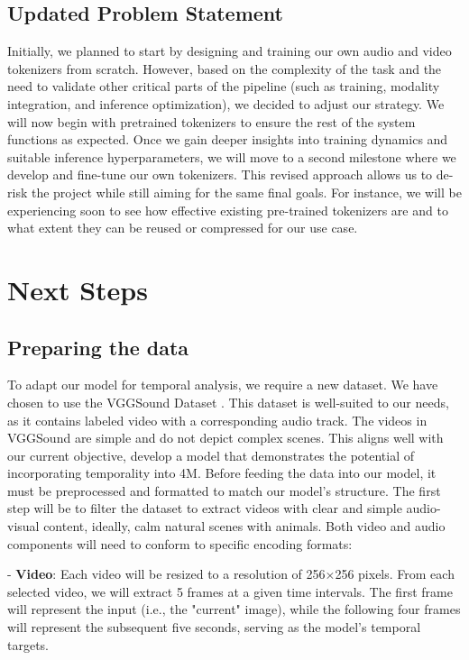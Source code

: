 \documentclass[10pt,conference,compsocconf]{IEEEtran}
\begin{document}
\subsection{Updated Problem Statement}
Initially, we planned to start by designing and training our own audio and video tokenizers from scratch. However, based on the complexity of the task and the need to validate other critical parts of the pipeline (such as training, modality integration, and inference optimization), we decided to adjust our strategy.
We will now begin with pretrained tokenizers to ensure the rest of the system functions as expected. Once we gain deeper insights into training dynamics and suitable inference hyperparameters, we will move to a second milestone where we develop and fine-tune our own tokenizers.
This revised approach allows us to de-risk the project while still aiming for the same final goals. For instance, we will be experiencing soon to see how effective existing pre-trained tokenizers are and to what extent they can be reused or compressed for our use case.


\section{Next Steps}
\subsection{Preparing the data}
To adapt our model for temporal analysis, we require a new dataset. We have chosen to use the VGGSound Dataset \cite{chen_vggsound_2020}. This dataset is well-suited to our needs, as it contains labeled video with a corresponding audio track. 
The videos in VGGSound are simple and do not depict complex scenes. This aligns well with our current objective, develop a model that demonstrates the potential of incorporating temporality into 4M.
Before feeding the data into our model, it must be preprocessed and formatted to match our model’s structure.
The first step will be to filter the dataset to extract videos with clear and simple audio-visual content, ideally, calm natural scenes with animals. 
Both video and audio components will need to conform to specific encoding formats:

- \textbf{Video}: Each video will be resized to a resolution of 256×256 pixels. From each selected video, we will extract 5 frames at a given time intervals. The first frame will represent the input (i.e., the "current" image), while the following four frames will represent the subsequent five seconds, serving as the model's temporal targets.
\end{document}
